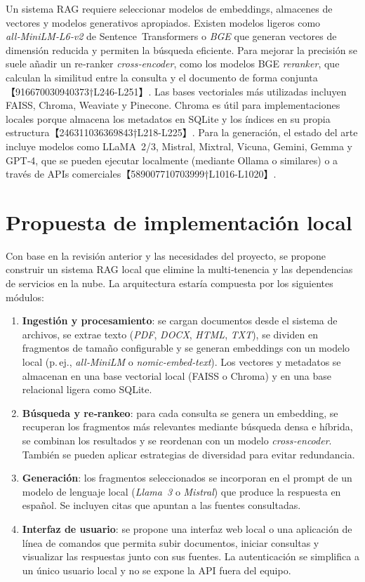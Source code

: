 Un sistema RAG requiere seleccionar modelos de embeddings, almacenes de vectores y modelos generativos apropiados.  Existen modelos ligeros como \textit{all‑MiniLM‑L6‑v2} de Sentence Transformers o \textit{BGE} que generan vectores de dimensión reducida y permiten la búsqueda eficiente.  Para mejorar la precisión se suele añadir un re‑ranker \textit{cross‑encoder}, como los modelos BGE \textit{reranker}, que calculan la similitud entre la consulta y el documento de forma conjunta【916670030940373†L246-L251】.  Las bases vectoriales más utilizadas incluyen FAISS, Chroma, Weaviate y Pinecone.  Chroma es útil para implementaciones locales porque almacena los metadatos en SQLite y los índices en su propia estructura【246311036369843†L218-L225】.  Para la generación, el estado del arte incluye modelos como LLaMA 2/3, Mistral, Mixtral, Vicuna, Gemini, Gemma y GPT‑4, que se pueden ejecutar localmente (mediante Ollama o similares) o a través de APIs comerciales【589007710703999†L1016-L1020】.

\section{Propuesta de implementación local}

Con base en la revisión anterior y las necesidades del proyecto, se propone construir un sistema RAG local que elimine la multi‑tenencia y las dependencias de servicios en la nube.  La arquitectura estaría compuesta por los siguientes módulos:

\begin{enumerate}
  \item \textbf{Ingestión y procesamiento}: se cargan documentos desde el sistema de archivos, se extrae texto (\textit{PDF}, \textit{DOCX}, \textit{HTML}, \textit{TXT}), se dividen en fragmentos de tamaño configurable y se generan embeddings con un modelo local (p.\,ej., \textit{all‑MiniLM} o \textit{nomic‑embed‑text}).  Los vectores y metadatos se almacenan en una base vectorial local (FAISS o Chroma) y en una base relacional ligera como SQLite.
  \item \textbf{Búsqueda y re‑rankeo}: para cada consulta se genera un embedding, se recuperan los fragmentos más relevantes mediante búsqueda densa e híbrida, se combinan los resultados y se reordenan con un modelo \textit{cross‑encoder}.  También se pueden aplicar estrategias de diversidad para evitar redundancia.
  \item \textbf{Generación}: los fragmentos seleccionados se incorporan en el prompt de un modelo de lenguaje local (\textit{Llama 3} o \textit{Mistral}) que produce la respuesta en español.  Se incluyen citas que apuntan a las fuentes consultadas.
  \item \textbf{Interfaz de usuario}: se propone una interfaz web local o una aplicación de línea de comandos que permita subir documentos, iniciar consultas y visualizar las respuestas junto con sus fuentes.  La autenticación se simplifica a un único usuario local y no se expone la API fuera del equipo.
\end{enumerate}

